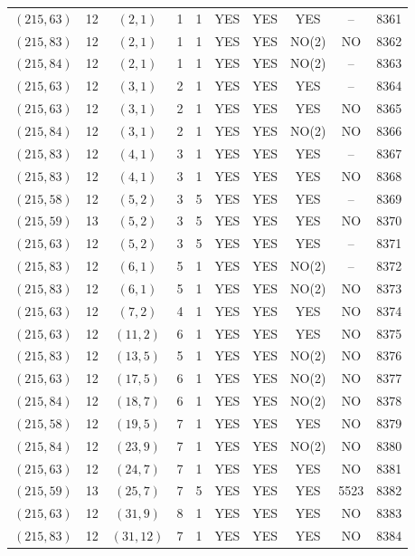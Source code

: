 \begin{longtable}{|c|c|c|c|c|c|c|c|c|c|}
$(215, 63)$ & 12 & $(2, 1)$ & 1 & 1 & YES & YES & YES & -- & 8361\\
$(215, 83)$ & 12 & $(2, 1)$ & 1 & 1 & YES & YES & NO(2) & NO & 8362\\
$(215, 84)$ & 12 & $(2, 1)$ & 1 & 1 & YES & YES & NO(2) & -- & 8363\\
$(215, 63)$ & 12 & $(3, 1)$ & 2 & 1 & YES & YES & YES & -- & 8364\\
$(215, 63)$ & 12 & $(3, 1)$ & 2 & 1 & YES & YES & YES & NO & 8365\\
$(215, 84)$ & 12 & $(3, 1)$ & 2 & 1 & YES & YES & NO(2) & NO & 8366\\
$(215, 83)$ & 12 & $(4, 1)$ & 3 & 1 & YES & YES & YES & -- & 8367\\
$(215, 83)$ & 12 & $(4, 1)$ & 3 & 1 & YES & YES & YES & NO & 8368\\
$(215, 58)$ & 12 & $(5, 2)$ & 3 & 5 & YES & YES & YES & -- & 8369\\
$(215, 59)$ & 13 & $(5, 2)$ & 3 & 5 & YES & YES & YES & NO & 8370\\
$(215, 63)$ & 12 & $(5, 2)$ & 3 & 5 & YES & YES & YES & -- & 8371\\
$(215, 83)$ & 12 & $(6, 1)$ & 5 & 1 & YES & YES & NO(2) & -- & 8372\\
$(215, 83)$ & 12 & $(6, 1)$ & 5 & 1 & YES & YES & NO(2) & NO & 8373\\
$(215, 63)$ & 12 & $(7, 2)$ & 4 & 1 & YES & YES & YES & NO & 8374\\
$(215, 63)$ & 12 & $(11, 2)$ & 6 & 1 & YES & YES & YES & NO & 8375\\
$(215, 83)$ & 12 & $(13, 5)$ & 5 & 1 & YES & YES & NO(2) & NO & 8376\\
$(215, 63)$ & 12 & $(17, 5)$ & 6 & 1 & YES & YES & NO(2) & NO & 8377\\
$(215, 84)$ & 12 & $(18, 7)$ & 6 & 1 & YES & YES & NO(2) & NO & 8378\\
$(215, 58)$ & 12 & $(19, 5)$ & 7 & 1 & YES & YES & YES & NO & 8379\\
$(215, 84)$ & 12 & $(23, 9)$ & 7 & 1 & YES & YES & NO(2) & NO & 8380\\
$(215, 63)$ & 12 & $(24, 7)$ & 7 & 1 & YES & YES & YES & NO & 8381\\
$(215, 59)$ & 13 & $(25, 7)$ & 7 & 5 & YES & YES & YES & 5523 & 8382\\
$(215, 63)$ & 12 & $(31, 9)$ & 8 & 1 & YES & YES & YES & NO & 8383\\
$(215, 83)$ & 12 & $(31, 12)$ & 7 & 1 & YES & YES & YES & NO & 8384\\

\end{longtable}
